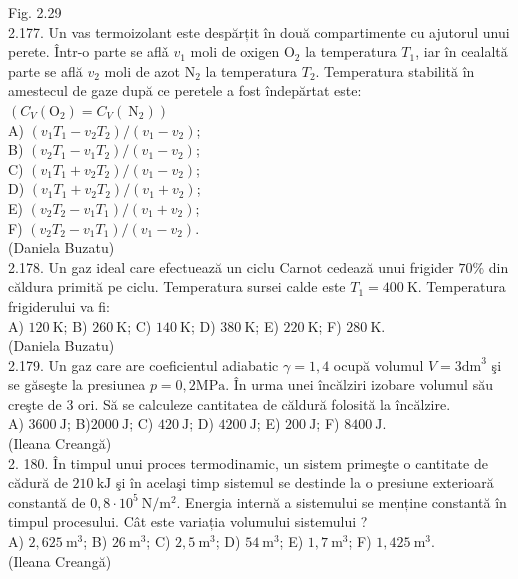 \documentclass[10pt]{article}
\begin{document}
Fig. 2.29\\

2.177. Un vas termoizolant este despărțit în două compartimente cu ajutorul unui perete. Într-o parte se aflǎ $v_{1}$ moli de oxigen $\mathrm{O}_{2}$ la temperatura $T_{1}$, iar în cealaltă parte se află $v_{2}$ moli de azot $\mathrm{N}_{2}$ la temperatura $T_{2}$. Temperatura stabilită în amestecul de gaze după ce peretele a fost îndepărtat este: $\left(C_{V}\left(\mathrm{O}_{2}\right)=C_{V}\left(\mathrm{~N}_{2}\right)\right)$\\
A) $\left(v_{1} T_{1}-v_{2} T_{2}\right) /\left(v_{1}-v_{2}\right)$;\\
B) $\left(v_{2} T_{1}-v_{1} T_{2}\right) /\left(v_{1}-v_{2}\right)$;\\
C) $\left(v_{1} T_{1}+v_{2} T_{2}\right) /\left(v_{1}-v_{2}\right)$;\\
D) $\left(v_{1} T_{1}+v_{2} T_{2}\right) /\left(v_{1}+v_{2}\right)$;\\
E) $\left(v_{2} T_{2}-v_{1} T_{1}\right) /\left(v_{1}+v_{2}\right)$;\\
F) $\left(v_{2} T_{2}-v_{1} T_{1}\right) /\left(v_{1}-v_{2}\right)$.\\
(Daniela Buzatu)\\

2.178. Un gaz ideal care efectuează un ciclu Carnot cedează unui frigider $70 \%$ din căldura primită pe ciclu. Temperatura sursei calde este $T_{1}=400 \mathrm{~K}$. Temperatura frigiderului va fi:\\ A) $120 \mathrm{~K}$; B) $260 \mathrm{~K}$; C) $140 \mathrm{~K}$; D) $380 \mathrm{~K}$; E) $220 \mathrm{~K}$; F) $280 \mathrm{~K}$.\\ (Daniela Buzatu)\\

2.179. Un gaz care are coeficientul adiabatic $\gamma=1,4$ ocupă volumul $V=3 \mathrm{dm}^{3}$ şi se găseşte la presiunea $p=0,2 \mathrm{MPa}$. În urma unei încălziri izobare volumul său creşte de 3 ori. Să se calculeze cantitatea de căldură folosită la încălzire.\\ A) $3600 \mathrm{~J}$; B)$2000 \mathrm{~J}$; C) $420 \mathrm{~J}$; D) $4200 \mathrm{~J}$; E) $200 \mathrm{~J}$; F) $8400 \mathrm{~J}$.\\ (Ileana Creangă)\\

2. 180. În timpul unui proces termodinamic, un sistem primeşte o cantitate de cădură de $210 \mathrm{~kJ}$ şi în acelaşi timp sistemul se destinde la o presiune exterioară constantă de $0,8 \cdot 10^{5} \mathrm{~N} / \mathrm{m}^{2}$. Energia internă a sistemului se menține constantă în timpul procesului. Cât este variația volumului sistemului ?\\ A) $2,625 \mathrm{~m}^{3}$; B) $26 \mathrm{~m}^{3}$; C) $2,5 \mathrm{~m}^{3}$; D) $54 \mathrm{~m}^{3}$; E) $1,7 \mathrm{~m}^{3}$; F) $1,425 \mathrm{~m}^{3}$.\\ (Ileana Creangă)\\
\end{document}
